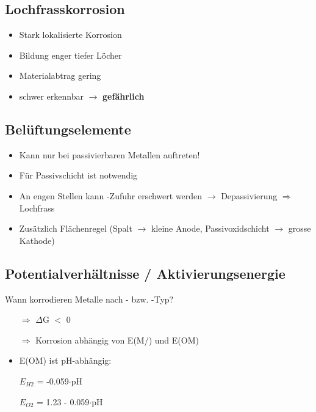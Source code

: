 \subsection{Lochfrasskorrosion}
    \begin{itemize}
        \item Stark lokalisierte Korrosion
        \item Bildung enger tiefer Löcher
        \item Materialabtrag gering
        \item schwer erkennbar $\to$ \textbf{gefährlich}
    \end{itemize}

\subsection{Belüftungselemente}
    \begin{itemize}
        \item Kann nur bei passivierbaren Metallen auftreten!
        \item Für Passivschicht ist  notwendig
        \item An engen Stellen kann -Zufuhr erschwert werden $\rightarrow$ Depassivierung $\Rightarrow$ Lochfrass
        \item Zusätzlich Flächenregel (Spalt $\rightarrow$ kleine Anode, Passivoxidschicht $\rightarrow$ grosse Kathode)
    \end{itemize}

\subsection{Potentialverhältnisse / Aktivierungsenergie}
    Wann korrodieren Metalle nach - bzw. -Typ?

    \begin{itemize}
        \item[$\Rightarrow$] $\Delta$G $<$ 0
        \item[$\Rightarrow$] Korrosion abhängig von E(M/) und E(OM)
        \item E(OM) ist pH-abhängig:
        \item[] $E_{H2}$ = -0.059$\cdot$pH
        \item[] $E_{O2}$ = 1.23 - 0.059$\cdot$pH
    \end{itemize}